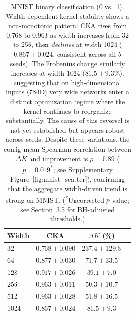 \documentclass[twoside,11pt]{article}
\begin{document}
\begin{table}[ht]
    \centering
    \caption{MNIST binary classification (0 vs.\ 1).  Width-dependent kernel stability shows a non-monotonic pattern: CKA rises from 0.768 to 0.963 as width increases from 32 to 256, then \emph{declines} at width 1024 ($0.867\pm0.024$, consistent across all 5 seeds).  The Frobenius change similarly increases at width 1024 ($81.5\pm9.3\%$), suggesting that on high-dimensional inputs (784D) very wide networks enter a distinct optimization regime where the kernel continues to reorganize substantially.  The cause of this reversal is not yet established but appears robust across seeds.  Despite these variations, the config-mean Spearman correlation between $\Delta K$ and improvement is $\rho=0.89$ ($p=0.019$\textsuperscript{*}; see Supplementary Figure~\ref{fig:mnist_scatter}), confirming that the aggregate width-driven trend is strong on MNIST.  (\textsuperscript{*}Uncorrected $p$-value; see Section~3.5 for BH-adjusted thresholds.)}
    \label{tab:mnist}
    \begin{tabular}{lccc}
    \toprule
    Width & CKA & $\Delta K$ (\%) \\
    \midrule
    32   & $0.768\pm0.090$ & $237.4\pm129.8$ \\
    64   & $0.877\pm0.030$ & $71.7\pm33.5$   \\
    128  & $0.917\pm0.026$ & $39.1\pm7.0$    \\
    256  & $0.963\pm0.011$ & $50.3\pm10.7$   \\
    512  & $0.963\pm0.028$ & $51.8\pm16.5$   \\
    1024 & $0.867\pm0.024$ & $81.5\pm9.3$    \\
    \bottomrule
    \end{tabular}
\end{table}
\end{document}
